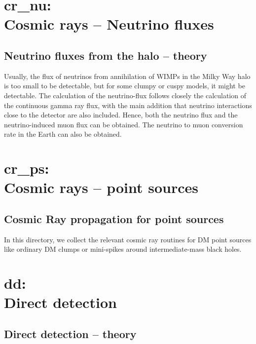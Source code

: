 \documentclass[a4paper,10pt,oneside]{book}
\newcommand{\codeb}[1]{\ftb{#1}}
\newcommand{\ftb}[1]{{\bfseries \sffamily #1}}
\begin{document}
\chapter[cr\_nu: Cosmic rays -- Neutrino fluxes]{\codeb{cr\_nu}:\\ Cosmic rays -- Neutrino fluxes}
\label{ch:src/cr_nu}

\section{Neutrino fluxes from the halo -- theory}


Usually, the flux of neutrinos from annihilation of WIMPs in
the Milky Way halo is too small to be detectable, but for some clumpy
or cuspy models, it might be detectable. The calculation of the
neutrino-flux follows closely the calculation of the continuous gamma
ray flux, with the main addition that neutrino interactions close to
the detector are also included. Hence, both the neutrino flux and the
neutrino-induced muon flux can be obtained. The neutrino to muon
conversion rate in the Earth can also be obtained.

\chapter[cr\_ps: Cosmic rays -- point sources]{\codeb{cr\_ps}:\\ Cosmic rays -- point sources}
\label{ch:src/cr_ps}

\section{Cosmic Ray propagation for point sources}

In this directory, we collect the relevant cosmic ray routines for DM point sources
like ordinary DM clumps or mini-spikes around intermediate-mass black holes. 

\chapter[dd: Direct detection]{\codeb{dd}:\\ Direct detection}
\label{ch:src/dd}

\section{Direct detection -- theory}
\end{document}
